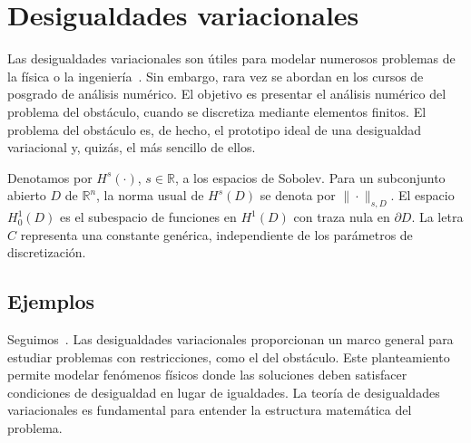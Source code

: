 \documentclass[12pt]{book}
\theoremstyle{definition}
\theoremstyle{plain}
\theoremstyle{remark}
\begin{document}
\chapter{Desigualdades variacionales}

Las desigualdades variacionales son útiles para modelar numerosos problemas de la física o la ingeniería~\cite{duvaut76,glowinski80,kinderlehrer80}. Sin embargo, rara vez se abordan en los cursos de posgrado de análisis numérico. El objetivo es presentar el análisis numérico del problema del obstáculo, cuando se discretiza mediante elementos finitos. El problema del obstáculo es, de hecho, el prototipo ideal de una desigualdad variacional y, quizás, el más sencillo de ellos.

Denotamos por \(H^{s}(\cdot)\), \(s\in \mathbb{R}\), a los espacios de Sobolev. Para un subconjunto abierto \(D\) de \(\mathbb{R}^n\), la norma usual de \(H^{s}(D)\) se denota por \(\|\cdot\|_{s,D}\). El espacio \(H^1_0(D)\) es el subespacio de funciones en \(H^1(D)\) con traza nula en \(\partial D\). La letra \(C\) representa una constante genérica, independiente de los parámetros de discretización.


\section{Ejemplos}

Seguimos~\cite{glowinski80}.
Las desigualdades variacionales proporcionan un marco general para estudiar problemas con restricciones, como el del obstáculo. Este planteamiento permite modelar fenómenos físicos donde las soluciones deben satisfacer condiciones de desigualdad en lugar de igualdades. La teoría de desigualdades variacionales es fundamental para entender la estructura matemática del problema.


\end{document}
